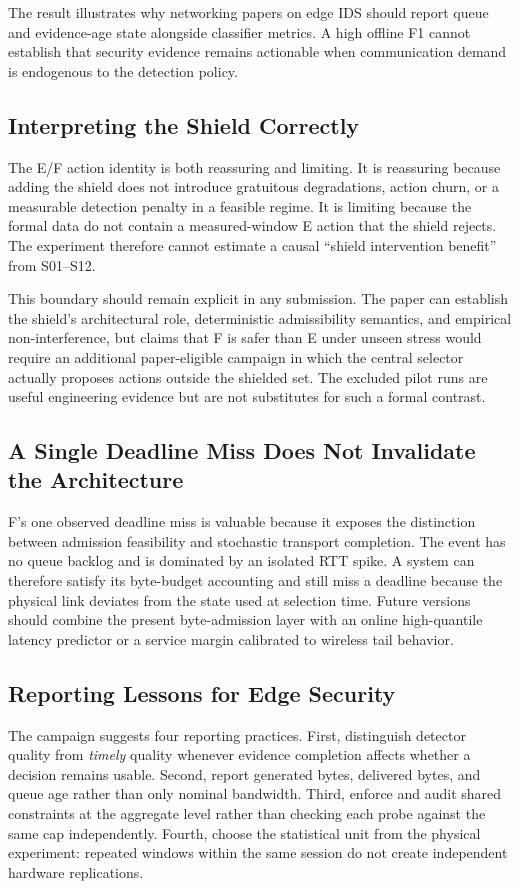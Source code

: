 \documentclass[10pt,journal]{IEEEtran}
\begin{document}
The result illustrates why networking papers on edge IDS should report queue and evidence-age state alongside classifier metrics. A high offline F1 cannot establish that security evidence remains actionable when communication demand is endogenous to the detection policy.

\subsection{Interpreting the Shield Correctly}
The E/F action identity is both reassuring and limiting. It is reassuring because adding the shield does not introduce gratuitous degradations, action churn, or a measurable detection penalty in a feasible regime. It is limiting because the formal data do not contain a measured-window E action that the shield rejects. The experiment therefore cannot estimate a causal ``shield intervention benefit'' from S01--S12.

This boundary should remain explicit in any submission. The paper can establish the shield's architectural role, deterministic admissibility semantics, and empirical non-interference, but claims that F is safer than E under unseen stress would require an additional paper-eligible campaign in which the central selector actually proposes actions outside the shielded set. The excluded pilot runs are useful engineering evidence but are not substitutes for such a formal contrast.

\subsection{A Single Deadline Miss Does Not Invalidate the Architecture}
F's one observed deadline miss is valuable because it exposes the distinction between admission feasibility and stochastic transport completion. The event has no queue backlog and is dominated by an isolated RTT spike. A system can therefore satisfy its byte-budget accounting and still miss a deadline because the physical link deviates from the state used at selection time. Future versions should combine the present byte-admission layer with an online high-quantile latency predictor or a service margin calibrated to wireless tail behavior.

\subsection{Reporting Lessons for Edge Security}
The campaign suggests four reporting practices. First, distinguish detector quality from \emph{timely} quality whenever evidence completion affects whether a decision remains usable. Second, report generated bytes, delivered bytes, and queue age rather than only nominal bandwidth. Third, enforce and audit shared constraints at the aggregate level rather than checking each probe against the same cap independently. Fourth, choose the statistical unit from the physical experiment: repeated windows within the same session do not create independent hardware replications.
\end{document}
